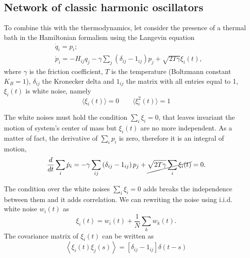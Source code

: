 \subsection{Network of classic harmonic oscillators}

To combine this with the thermodynamics, let consider the presence of a thermal bath in the Hamiltonian formalism using the Langevin equation
\begin{equation}
    \begin{aligned}
        &\dot q_i = p_i; \\
        &\dot p_i  = -H_{ij}q_j - \gamma \sum_j \left(\delta_{ij} - 1_{ij}\right)p_j + \sqrt{2T\gamma}\xi_i(t),
    \end{aligned}
\end{equation}
where $\gamma$ is the friction coefficient, $T$ is the temperature (Boltzmann constant $K_B =1$), $\delta_{ij}$ the Kronecker delta and $1_{ij}$ the matrix with all entries equal to 1, $\xi_i(t)$ is white noise, namely
\begin{equation}\label{white_noise}
    \langle\xi_i(t)\rangle = 0 \qquad \langle\xi_i^2(t)\rangle = 1 
\end{equation}

The white noises must hold the condition $\sum_i \xi_i = 0$, that leaves invariant the motion of  system's center of mass but $\xi_i(t)$ are no more independent.
As a matter of fact, the derivative of $\sum_i p_i$ is zero, therefore it is an integral of motion,
\begin{equation}
    \frac{d}{dt} \sum_i \dot p_i = - \gamma \sum_{ij}\left(\delta_{ij} - 1_{ij}\right)p_j+ \cancel{\sqrt{2T\gamma}\sum_i\xi_i(t)} = 0.
\end{equation}

The condition over the white noises $\sum_i \xi_i = 0$ adds breaks the independence between them and it adds correlation.
We can rewriting the noise using i.i.d. white noise $w_i(t)$ as
\begin{equation}
    \xi_i(t) = w_i (t) + \frac{1}{N} \sum_k w_k(t).
\end{equation}
The covariance matrix of $\xi_i(t)$ can be written as
\begin{equation}
    \left<\xi_i(t)\xi_j(s)\right> = \left[\delta_{ij} - 1_{ij}\right]\delta(t-s)
\end{equation}

